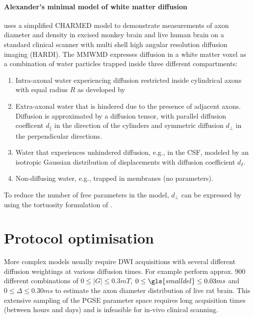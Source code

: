 \paragraph*{Alexander's minimal model of white matter diffusion} 
\label{par:alexanders_model}
\citet{Alexander:2010} uses a simplified CHARMED model to demonstrate measurements of axon diameter and density in excised monkey brain and live human brain on a standard clinical scanner with multi shell high angular resolution diffusion imaging (HARDI). The \gls{MMWMD} expresses diffusion in a white matter voxel as a combination of water particles trapped inside three different compartments: 
\begin{enumerate}
  \item Intra-axonal water experiencing diffusion restricted inside cylindrical axons with equal radius $R$ as developed by \citet{Gelderen:1994}
  \item Extra-axonal water that is hindered due to the presence of adjacent axons. Diffusion is approximated by a diffusion tensor, with parallel diffusion coefficent $d_\parallel$ in the direction of the cylinders and symmetric diffusion $d_\perp$ in the perpendicular directions.
  \item Water that experiences unhindered diffusion, e.g., in the {\gls{CSF}}, modeled by an isotropic Gaussian distribution of displacements with diffusion coefficient $d_{I}$.
  \item Non-diffusing water, e.g., trapped in membranes (no parameters).
\end{enumerate}
  
To reduce the number of free parameters in the model, $d_\perp$ can be expressed by using the tortuosity formulation of \citet{Szafer:1995}.

\section{Protocol optimisation}
\label{sec:protocol_optimisation}
More complex models usually require  {\gls{DWI}}  acquisitions with several different diffusion weightings at various diffusion times. For example \citet{Barazany:2009} perform approx. 900 different combinations of $0\le|G|\le 0.3mT$, $0\le {\gls{smalldel}} \le 0.03ms$ and $0\le \Delta \le 0.30ms$ to estimate the axon diameter distribution of live rat brain. This extensive sampling of the \gls{PGSE} parameter space requires long acquisition times (between hours and days) and is infeasible for in-vivo clinical scanning. 

